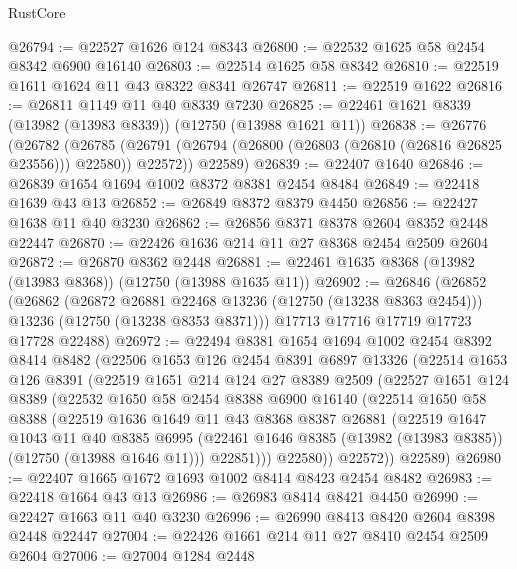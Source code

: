 \begin{lexlean}{RustCore}
\begin{coremodule}
@26794 := @22527 @1626 @124 @8343
@26800 := @22532 @1625 @58 @2454 @8342 @6900 @16140
@26803 := @22514 @1625 @58 @8342
@26810 := @22519 @1611 @1624 @11 @43 @8322 @8341 @26747
@26811 := @22519 @1622
@26816 := @26811 @1149 @11 @40 @8339 @7230
@26825 := @22461 @1621 @8339 (@13982 (@13983 @8339)) (@12750 (@13988 @1621 @11))
@26838 := @26776
    (@26782
      (@26785 (@26791 (@26794 (@26800 (@26803 (@26810 (@26816 @26825 @23556))) @22580)) @22572))
      @22589)
@26839 := @22407 @1640
@26846 := @26839 @1654 @1694 @1002 @8372 @8381 @2454 @8484
@26849 := @22418 @1639 @43 @13
@26852 := @26849 @8372 @8379 @4450
@26856 := @22427 @1638 @11 @40 @3230
@26862 := @26856 @8371 @8378 @2604 @8352 @2448 @22447
@26870 := @22426 @1636 @214 @11 @27 @8368 @2454 @2509 @2604
@26872 := @26870 @8362 @2448
@26881 := @22461 @1635 @8368 (@13982 (@13983 @8368)) (@12750 (@13988 @1635 @11))
@26902 := @26846
    (@26852
      (@26862
        (@26872 @26881 @22468 @13236 (@12750 (@13238 @8363 @2454)))
        @13236
        (@12750 (@13238 @8353 @8371)))
      @17713
      @17716
      @17719
      @17723
      @17728
      @22488)
@26972 := @22494
    @8381
    @1654
    @1694
    @1002
    @2454
    @8392
    @8414
    @8482
    (@22506
      @1653
      @126
      @2454
      @8391
      @6897
      @13326
      (@22514
        @1653
        @126
        @8391
        (@22519
          @1651
          @214
          @124
          @27
          @8389
          @2509
          (@22527
            @1651
            @124
            @8389
            (@22532
              @1650
              @58
              @2454
              @8388
              @6900
              @16140
              (@22514
                @1650
                @58
                @8388
                (@22519
                  @1636
                  @1649
                  @11
                  @43
                  @8368
                  @8387
                  @26881
                  (@22519
                    @1647
                    @1043
                    @11
                    @40
                    @8385
                    @6995
                    (@22461 @1646 @8385 (@13982 (@13983 @8385)) (@12750 (@13988 @1646 @11)))
                    @22851)))
              @22580))
          @22572))
      @22589)
@26980 := @22407 @1665 @1672 @1693 @1002 @8414 @8423 @2454 @8482
@26983 := @22418 @1664 @43 @13
@26986 := @26983 @8414 @8421 @4450
@26990 := @22427 @1663 @11 @40 @3230
@26996 := @26990 @8413 @8420 @2604 @8398 @2448 @22447
@27004 := @22426 @1661 @214 @11 @27 @8410 @2454 @2509 @2604
@27006 := @27004 @1284 @2448

\end{coremodule}
\end{lexlean}
